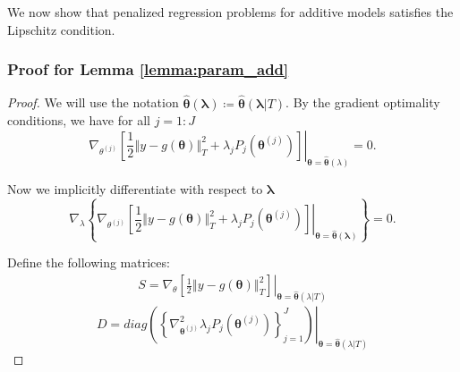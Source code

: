 \documentclass[10pt]{book}
\theoremstyle{definition}
\begin{document}
We now show that penalized regression problems for additive models satisfies the Lipschitz condition.
\subsubsection{Proof for Lemma \ref{lemma:param_add}}
\begin{proof}
	We will use the notation $\hat{\boldsymbol{\theta}}(\boldsymbol{\lambda}) \coloneqq \hat{\boldsymbol{\theta}}(\boldsymbol{\lambda} | T)$. By the gradient optimality conditions, we have for all $j=1:J$ 
	\begin{equation}
	\label{eq:grad_opt}
	\left.\nabla_{\theta^{(j)}} \left [
	\frac{1}{2}\left\Vert y-g(\boldsymbol{\theta})\right\Vert _{T}^{2}+\lambda_{j}P_{j}(\boldsymbol{\theta}^{(j)})
	\right ]
	\right|_{\boldsymbol{\theta}=\hat{\boldsymbol{\theta}}(\lambda)}=0.
	\end{equation}
	
	Now we implicitly differentiate with respect to $\boldsymbol{\lambda}$ 
	\begin{equation}
	\label{eq:implicit_diff}
	\nabla_{\lambda}\left\{ \left.\nabla_{\theta^{(j)}}
	\left [
	\frac{1}{2}\left\Vert y-g(\boldsymbol{\theta})\right\Vert _{T}^{2}+\lambda_{j}P_{j}(\boldsymbol{\theta}^{(j)})
	\right ]
	\right|_{\boldsymbol{\theta}=\hat{\boldsymbol{\theta}}(\boldsymbol{\lambda})}\right\} =0.
	\end{equation}
	
	Define the following matrices:
	\begin{align*}
		S = \left.\nabla_{\theta}\left [
		\frac{1}{2}\left\Vert y-g(\boldsymbol{\theta})\right\Vert _{T}^{2}
		\right ]
		\right|_{\boldsymbol{\theta}=\hat{\boldsymbol{\theta}}(\lambda | T)}
	\end{align*}
	\[
	D=\left.diag\left(\left\{ \nabla_{\boldsymbol{\theta}^{(j)}}^{2}\lambda_{j}P_{j}(\boldsymbol{\theta}^{(j)})\right\} _{j=1}^{J}\right)\right|_{\boldsymbol{\theta}=\hat{\boldsymbol{\theta}}(\lambda|T)}
	\]
	

\end{proof}
\end{document}
